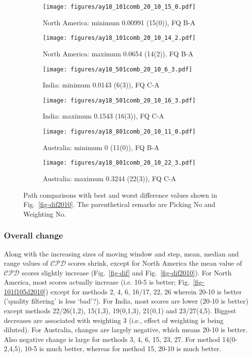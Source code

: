 \begin{figure*}
	\centering
	\begin{subfigure}{.43\textwidth}
		\texttt{[image: figures/ay18\_101comb\_20\_10\_15\_0.pdf]}
		\caption{North America: minimum 0.00991 (15(0)), FQ B-A}
	\end{subfigure}
	\begin{subfigure}{.43\textwidth}
		\texttt{[image: figures/ay18\_101comb\_20\_10\_14\_2.pdf]}
		\caption{North America: maximum 0.0654 (14(2)), FQ B-A}
	\end{subfigure}
	\vspace{.1em}
	\begin{subfigure}{.43\textwidth}
		\texttt{[image: figures/ay18\_501comb\_20\_10\_6\_3.pdf]}
		\caption{India: minimum 0.0143 (6(3)), FQ C-A}
	\end{subfigure}
	\begin{subfigure}{.43\textwidth}
		\texttt{[image: figures/ay18\_501comb\_20\_10\_16\_3.pdf]}
		\caption{India: maximum 0.1543 (16(3)), FQ C-A}
	\end{subfigure}
	\vspace{.1em}
	\begin{subfigure}{.43\textwidth}
		\texttt{[image: figures/ay18\_801comb\_20\_10\_11\_0.pdf]}
		\caption{Australia: minimum 0 (11(0)), FQ B-A}\label{fig-au-2010110}
	\end{subfigure}
	\begin{subfigure}{.43\textwidth}
		\texttt{[image: figures/ay18\_801comb\_20\_10\_22\_3.pdf]}
		\caption{Australia: maximum 0.3244 (22(3)), FQ C-A}\label{fig-au-2010223}
	\end{subfigure}
	\caption[Best and worst differences (20 Myr bin, 10 Myr step)]{Path
comparisons with best and worst difference values shown in
Fig.~\ref{fig-dif2010}. The parenthetical remarks are Picking No and Weighting
No.}\label{fig-dif2010bw}
\end{figure*}

\subsubsection{Overall change}

Along with the increasing sizes of moving window and step, mean, median and
range values of $\mathcal{CPD}$ scores shrink, except for North America the mean
value of $\mathcal{CPD}$ scores slightly increase (Fig.~\ref{fig-dif} and
Fig.~\ref{fig-dif2010}). For North America, most scores actually increase (i.e.
10-5 is better; Fig.~\ref{fig-101f105d2010}) except for methods 2, 4, 6, 16/17,
22, 26 wherein 20-10 is better ('quality filtering' is less `bad’?). For India,
most scores are lower (20-10 is better) except methods 22/26(1,2), 15(1,3),
19(0,1,3), 21(0,1) and 23/27(4,5). Biggest decreases are associated with
weighting 3 (i.e., effect of weighting is being diluted). For Australia, changes
are largely negative, which means 20-10 is better. Also negative change is large
for methods 3, 4, 6, 15, 23, 27. For method 14(0-2,4,5), 10-5 is much better,
whereas for method 15, 20-10 is much better.

